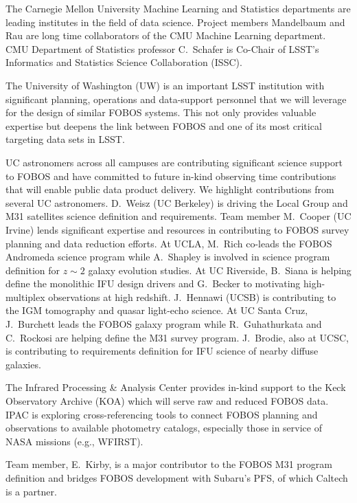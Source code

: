 \documentclass[oneside,11pt]{amsart}
\begin{document}
 The Carnegie Mellon
University Machine Learning and Statistics departments are leading
institutes in the field of data science. Project members Mandelbaum
and Rau are long time collaborators of the CMU Machine Learning
department. CMU Department of Statistics professor C.~Schafer is
Co-Chair of LSST's Informatics and Statistics Science Collaboration
(ISSC).

 The University of
Washington (UW) is an important LSST institution with significant
planning, operations and data-support personnel that we will leverage
for the design of similar FOBOS systems. This not only provides
valuable expertise but deepens the link between FOBOS and one of its
most critical targeting data sets in LSST.

 UC astronomers across all campuses
are contributing significant science support to FOBOS and have
committed to future in-kind observing time contributions that will
enable public data product delivery. We highlight contributions from
several UC astronomers. D.~Weisz (UC Berkeley) is driving the Local
Group and M31 satellites science definition and requirements. Team
member M.~Cooper (UC Irvine) lends significant expertise and
resources in contributing to FOBOS survey planning and data reduction
efforts. At UCLA, M.~Rich co-leads the FOBOS Andromeda science
program while A.~Shapley is involved in science program definition
for $z \sim 2$ galaxy evolution studies. At UC Riverside, B.~Siana is
helping define the monolithic IFU design drivers and G.~Becker to
motivating high-multiplex observations at high redshift. J.~Hennawi
(UCSB) is contributing to the IGM tomography and quasar light-echo
science. At UC Santa Cruz, J.~Burchett leads the FOBOS galaxy program
while R.~Guhathurkata and C.~Rockosi are helping define the M31
survey program. J.~Brodie, also at UCSC, is contributing to
requirements definition for IFU science of nearby diffuse galaxies.

 The Infrared Processing \& Analysis Center
provides in-kind support to the Keck Observatory Archive (KOA) which
will serve raw and reduced FOBOS data. IPAC is exploring
cross-referencing tools to connect FOBOS planning and observations to
available photometry catalogs, especially those in service of NASA
missions (e.g., WFIRST).

 Team member, E.~Kirby, is a major
contributor to the FOBOS M31 program definition and bridges FOBOS
development with Subaru's PFS, of which Caltech is a partner.
\end{document}
